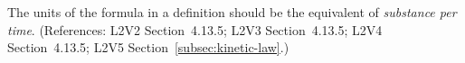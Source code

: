 The units of the  formula in a \KineticLaw definition should be
the equivalent of \emph{substance per time}.  (References: L2V2
Section~4.13.5; L2V3 Section~4.13.5; L2V4 Section~4.13.5; L2V5 Section~\ref{subsec:kinetic-law}.)
